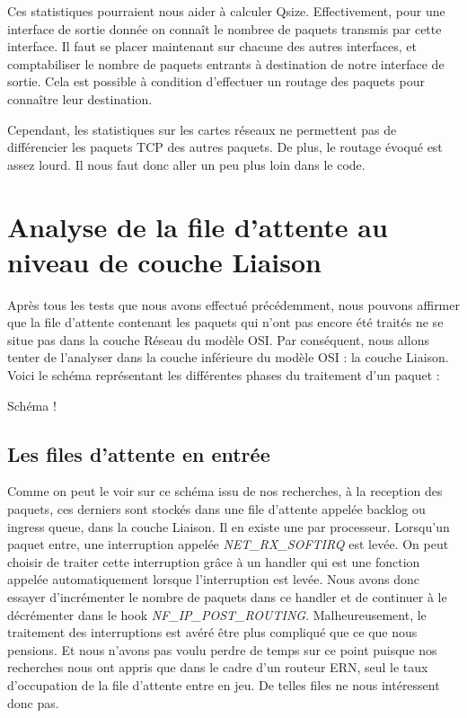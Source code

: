 \documentclass[a4paper]{article}
\begin{document}
Ces statistiques pourraient nous aider à calculer Qsize. 
Effectivement, pour une interface de sortie donnée on connaît le nombree de paquets transmis par cette interface.
Il faut se placer maintenant sur chacune des autres interfaces, et comptabiliser le nombre de paquets entrants à destination
de notre interface de sortie. Cela est possible à condition d'effectuer un routage des paquets pour connaître leur destination.

Cependant,
les statistiques sur les cartes réseaux ne permettent pas de différencier les paquets TCP des autres paquets. De plus, le routage évoqué
est assez lourd. Il nous faut donc aller un peu plus loin dans le code.

\section{Analyse de la file d'attente au niveau de couche Liaison
}

Après tous les tests que nous avons effectué précédemment, nous pouvons affirmer
 que la file d'attente contenant les paquets qui n'ont pas encore été traités ne
  se situe pas dans la couche Réseau du modèle 
  OSI. Par conséquent, nous allons tenter de l'analyser dans la couche
   inférieure du modèle OSI : la couche Liaison. Voici le schéma représentant
    les différentes phases du traitement d'un paquet :

Schéma !

\subsection{Les files d'attente en entrée}
Comme on peut le voir sur ce schéma issu de nos recherches, à la reception des paquets, ces derniers sont stockés dans une file d'attente appelée backlog \cite{10poin} ou ingress queue, dans la couche Liaison. Il en existe une par processeur. 
Lorsqu'un paquet entre, une interruption appelée \textit{NET\_RX\_SOFTIRQ} est levée. On peut choisir de traiter cette interruption grâce à un handler qui est une fonction appelée automatiquement lorsque l'interruption est levée. Nous avons donc essayer d'incrémenter le nombre de paquets dans ce handler et de continuer à le décrémenter  dans le hook \textit{NF\_IP\_POST\_ROUTING}. Malheureusement, le traitement des interruptions est avéré être plus compliqué que ce que nous pensions. Et nous n'avons pas voulu perdre de temps sur ce point puisque nos recherches nous ont appris que dans le cadre d'un routeur ERN, seul le taux d'occupation de la file d'attente entre en jeu. De telles files ne nous intéressent donc pas. 
\end{document}
